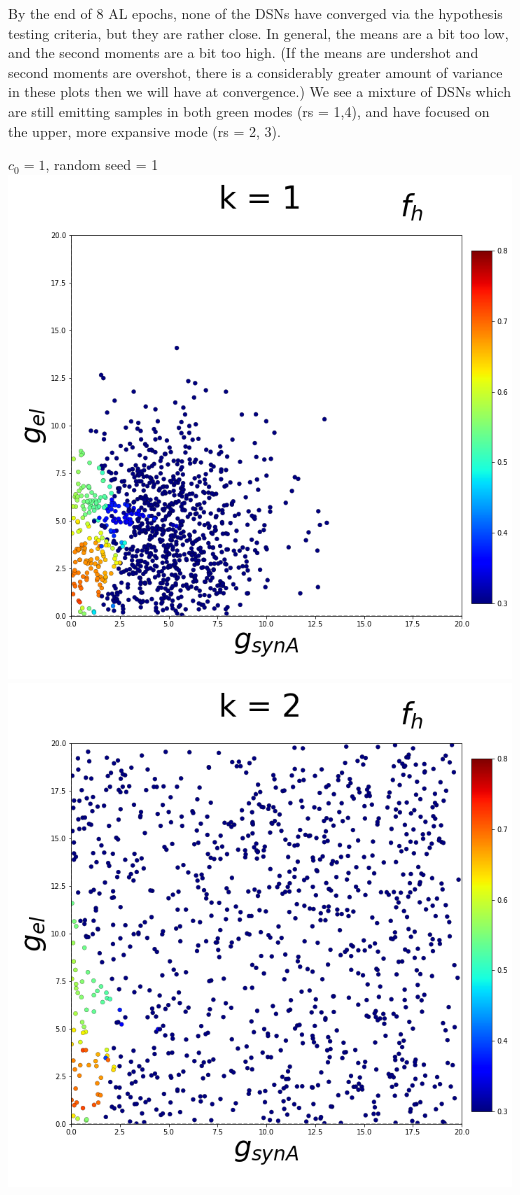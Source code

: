 \documentclass[11pt]{article}
\begin{document}
By the end of 8 AL epochs, none of the DSNs have converged via the hypothesis testing criteria, but they are rather close.  In general, the means are a bit too low, and the second moments are a bit too high.  (If the means are undershot and second moments are overshot, there is a considerably greater amount of variance in these plots then we will have at convergence.)  We see a mixture of DSNs which are still emitting samples in both green modes (rs = 1,4), and have focused on the upper, more expansive mode (rs = 2, 3).

\begin{center}
{\Large $c_0 = 1$, random seed = 1} \\
\includegraphics[scale=0.125]{DSN_figs/STGCircuit_DSN_c=0_rs=1_k=1.png}
\includegraphics[scale=0.125]{DSN_figs/STGCircuit_DSN_c=0_rs=1_k=2.png}

\end{center}
\end{document}
